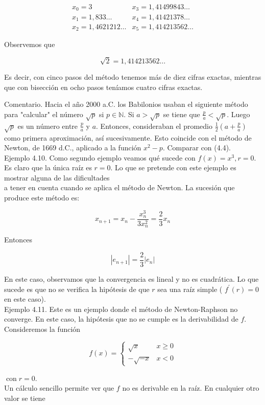 \documentclass[10pt]{article}
\begin{document}
$$
\begin{array}{ll}
x_{0}=3 & x_{3}=1,41499843 \ldots \\
x_{1}=1,833 \ldots & x_{4}=1,41421378 \ldots \\
x_{2}=1,4621212 \ldots & x_{5}=1,414213562 \ldots
\end{array}
$$

Observemos que

$$
\sqrt{2}=1,414213562 \ldots
$$

Es decir, con cinco pasos del método tenemos más de diez cifras exactas, mientras que con bisección en ocho pasos teníamos cuatro cifras exactas.

Comentario. Hacia el año 2000 a.C. los Babilonios usaban el siguiente método para "calcular" el número $\sqrt{p}$ si $p \in \mathbb{N}$. Si $a>\sqrt{p}$ se tiene que $\frac{p}{a}<\sqrt{p}$. Luego $\sqrt{p}$ es un número entre $\frac{p}{a}$ y $a$. Entonces, consideraban el promedio $\frac{1}{2}\left(a+\frac{p}{a}\right)$ como primera aproximación, así sucesivamente. Esto coincide con el método de Newton, de 1669 d.C., aplicado a la función $x^{2}-p$. Comparar con (4.4).\\
Ejemplo 4.10. Como segundo ejemplo veamos qué sucede con $f(x)=x^{3}, r=0$. Es claro que la única raíz es $r=0$. Lo que se pretende con este ejemplo es mostrar alguna de las dificultades\\
a tener en cuenta cuando se aplica el método de Newton. La sucesión que produce este método es:

$$
x_{n+1}=x_{n}-\frac{x_{n}^{3}}{3 x_{n}^{2}}=\frac{2}{3} x_{n}
$$

Entonces

$$
\left|e_{n+1}\right|=\frac{2}{3}\left|e_{n}\right|
$$

En este caso, observamos que la convergencia es lineal y no es cuadrática. Lo que sucede es que no se verifica la hipótesis de que $r$ sea una raíz simple ( $f^{\prime}(r)=0$ en este caso).\\
Ejemplo 4.11. Este es un ejemplo donde el método de Newton-Raphson no converge. En este caso, la hipótesis que no se cumple es la derivabilidad de $f$. Consideremos la función

$$
f(x)= \begin{cases}\sqrt{x} & x \geq 0 \\ -\sqrt{-x} & x<0\end{cases}
$$

$\operatorname{con} r=0$.\\
Un cálculo sencillo permite ver que $f$ no es derivable en la raíz. En cualquier otro valor se tiene
\end{document}

